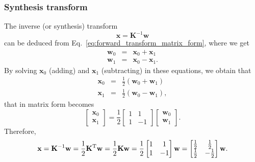 \subsubsection{Synthesis transform}
The inverse (or synthesis) transform
\begin{equation}
  {\mathbf x} = {\mathbf K}^{-1}{\mathbf w}
  \label{eq:inverse_transform}
\end{equation}
can be deduced from Eq.~\eqref{eq:forward_transform_matrix_form}, where we
get
\begin{equation}
  \begin{array}{rcl}
  {\mathbf w}_0 & = & {\mathbf x}_0 + {\mathbf x}_1\\
  {\mathbf w}_1 & = & {\mathbf x}_0 - {\mathbf x}_1.
  \end{array}
\end{equation}
By solving ${\mathbf x}_0$ (adding) and ${\mathbf x}_1$ (subtracting) in
these equations, we obtain that
\begin{equation}
  \begin{array}{rcl}
  {\mathbf x}_0 & = & \frac{1}{2}({\mathbf w}_0 + {\mathbf w}_1)\\
  {\mathbf x}_1 & = & \frac{1}{2}({\mathbf w}_0 - {\mathbf w}_1),
  \end{array}
\end{equation}
that in matrix form becomes
\begin{equation}
  \begin{bmatrix}
    {\mathbf x}_0 \\
    {\mathbf x}_1
  \end{bmatrix}
  = \frac{1}{2}
  \begin{bmatrix} 1 & 1 \\ 1 & -1 \end{bmatrix}
  \begin{bmatrix}
    {\mathbf w}_0 \\
    {\mathbf w}_1
  \end{bmatrix}.
\end{equation}
Therefore,
\begin{equation}
  {\mathbf x} = {\mathbf K}^{-1}{\mathbf w} = \frac{1}{2}{\mathbf K}^{\text T}{\mathbf w} = \frac{1}{2}{\mathbf K}{\mathbf w} = \frac{1}{2}\begin{bmatrix} 1 & 1 \\ 1 & -1 \end{bmatrix}{\mathbf w} = \begin{bmatrix} \frac{1}{2} & \frac{1}{2} \\ \frac{1}{2} & -\frac{1}{2} \end{bmatrix}{\mathbf w}.
  \label{eq:inverse_transform_matrix_form}
\end{equation}

